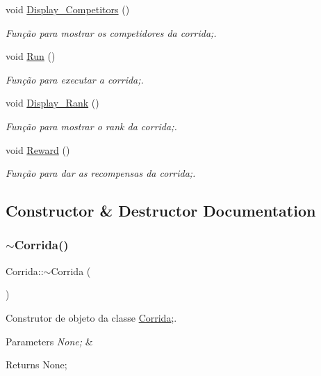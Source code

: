 \begin{DoxyCompactItemize}
void \mbox{\hyperlink{class_corrida_a23465aa00504a4f1ac6db74cac94562b}{Display\+\_\+\+Competitors}} ()
\begin{DoxyCompactList}\small\item\em Função para mostrar os competidores da corrida;. \end{DoxyCompactList}\item 
void \mbox{\hyperlink{class_corrida_a836b007451d1382a11e9c064d7167f7a}{Run}} ()
\begin{DoxyCompactList}\small\item\em Função para executar a corrida;. \end{DoxyCompactList}\item 
void \mbox{\hyperlink{class_corrida_a2023bf935b17595f4140083dd1027b38}{Display\+\_\+\+Rank}} ()
\begin{DoxyCompactList}\small\item\em Função para mostrar o rank da corrida;. \end{DoxyCompactList}\item 
void \mbox{\hyperlink{class_corrida_a389a44a45d0a045ba21939834c9fdfdd}{Reward}} ()
\begin{DoxyCompactList}\small\item\em Função para dar as recompensas da corrida;. \end{DoxyCompactList}\end{DoxyCompactItemize}


\subsection{Constructor \& Destructor Documentation}
\mbox{\label{class_corrida_ac307c46d186eb20b4bc6f600bd7c575a}} 
\subsubsection{\texorpdfstring{$\sim$\+Corrida()}{~Corrida()}}
{\footnotesize\ttfamily Corrida\+::$\sim$\+Corrida (\begin{DoxyParamCaption}{ }\end{DoxyParamCaption})}



Construtor de objeto da classe \mbox{\hyperlink{class_corrida}{Corrida}};. 


\begin{DoxyParams}{Parameters}
{\em None;} & \\
\hline
\end{DoxyParams}
\begin{DoxyReturn}{Returns}
None; 
\end{DoxyReturn}
\mbox{\label{class_corrida_a74d4f707603910aed96f3acd8ee4bc62}} 
